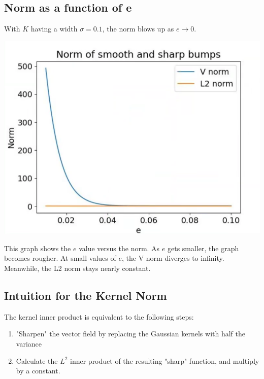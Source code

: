 \documentclass[10pt]{article}
\begin{document}
\subsection*{Norm as a function of e}
With $K$ having a width $\sigma = 0.1$, the norm blows up as $e \rightarrow 0$.
\begin{center}
    \includegraphics*[scale=0.5]{W3_8.png}
\end{center}
This graph shows the $e$ value versus the norm.  As $e$ gets smaller, the graph becomes rougher.  At small values of $e$, the V norm diverges to infinity.  Meanwhile, the L2 norm stays nearly constant.

\pagebreak
\subsection*{Intuition for the Kernel Norm}
The kernel inner product is equivalent to the following steps:
\begin{enumerate}
    \item "Sharpen" the vector field by replacing the Gaussian kernels with half the variance
    \item Calculate the $L^2$ inner product of the resulting "sharp" function, and multiply by a constant.
\end{enumerate}
\end{document}
